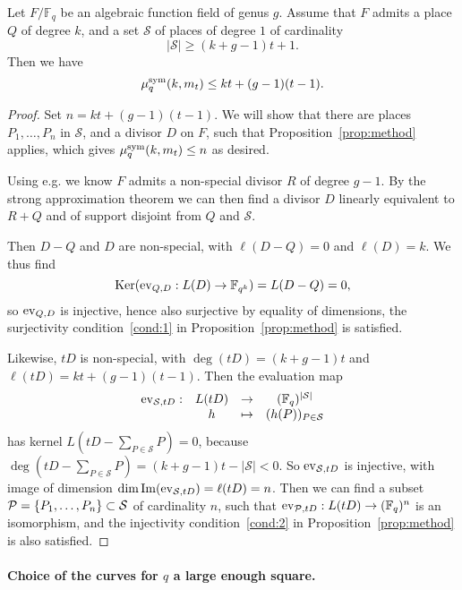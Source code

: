 \documentclass[11pt]{article}
\begin{document}
\begin{prop}
\label{prop:numerical}
Let $F/\mathbb{F}_{q}$ be an algebraic function field of genus $g$.
Assume that $F$ admits a place $Q$ of degree $k$, and a set $\mathcal{S}$ of places of degree $1$ of cardinality
\[
  |\mathcal{S}|\geq (k+g-1)t+1.
\]
Then we have
\[ \mu^{\textrm{sym}}_q(k,m_t)\leq kt+(g-1)(t-1). \]
\end{prop}
\begin{proof}
Set $n=kt+(g-1)(t-1)$. We will show that there are places $P_1,\dots,P_n$ in $\mathcal{S}$,
and a divisor $D$ on $F$, such that Proposition~\ref{prop:method} applies,
which gives $\mu^{\textrm{sym}}_q(k,m_t)\leq n$ as desired.

Using e.g. \cite[Lemma~2.1]{Ballet99} we know $F$ admits a non-special divisor $R$ of degree $g-1$.
By the strong approximation theorem \cite[Thm.~1.6.5]{Stichtenoth09}
we can then find a divisor $D$ linearly equivalent to $R+Q$ and of support disjoint from $Q$ and $\mathcal{S}$.

Then $D-Q$ and $D$ are non-special, with $\ell(D-Q)=0$ and $\ell(D)=k$.
We thus find
\[
  \operatorname{Ker}(\operatorname{ev}_{Q, D}:L(D)\to\mathbb{F}_{q^k}) = L(D-Q) = 0,
\]
so $\operatorname{ev}_{Q, D}$ is injective, hence also surjective by equality of dimensions,
\ie the surjectivity condition~\ref{cond:1} in Proposition~\ref{prop:method} is satisfied.

Likewise, $tD$ is non-special, with $\deg(tD)=(k+g-1)t$ and $\ell(tD)=kt+(g-1)(t-1)$.
Then the evaluation map
\[
\begin{array}{cccc}
\operatorname{ev}_{\mathcal{S}, tD}: & L(tD) & \to & (\mathbb{F}_{q})^{|\mathcal{S}|}\\
  & h & \mapsto & (h(P))_{P\in\mathcal{S}}
\end{array}
\]
has kernel $L(tD-\sum_{P\in\mathcal{S}}P)=0$, because $\deg(tD-\sum_{P\in\mathcal{S}}P)=(k+g-1)t-|\mathcal{S}|<0$.
So $\operatorname{ev}_{\mathcal{S}, tD}$ is injective, with image of dimension $\dim\operatorname{Im}(\operatorname{ev}_{\mathcal{S}, tD})=\ell(tD)=n$.
Then we can find a subset $\mathcal{P}=\{P_1,\dots,P_n\}\subset\mathcal{S}$ of cardinality $n$,
such that $\operatorname{ev}_{\mathcal{P}, tD}: L(tD) \to (\mathbb{F}_{q})^n$ is an isomorphism,
and the injectivity condition~\ref{cond:2} in Proposition~\ref{prop:method} is also satisfied.
\end{proof}

\paragraph{Choice of the curves for $q$ a large enough square.}
\end{document}
